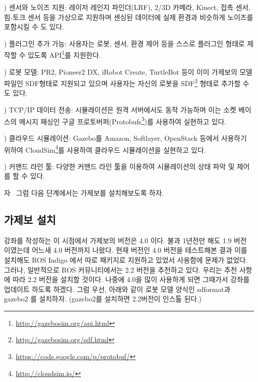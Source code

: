 \vspace{\baselineskip}
\noindent{}
\thenum) 센서와 노이즈 지원: 레이저 레인지 파인더(LRF), 2/3D 카메라, Kinect, 접촉 센서, 힘-토크 센서 등을 가상으로 지원하며 센싱된 데이터에 실제 환경과 비슷하게 노이즈를 포함시킬 수 도 있다.

\vspace{\baselineskip}
\noindent{}
\thenum) 플러그인 추가 가능: 사용자는 로봇, 센서, 환경 제어 등을 스스로 플러그인 형태로 제작할 수 있도록 API\footnote{\url{http://gazebosim.org/api.html}}를 지원한다.

\vspace{\baselineskip}
\noindent{}
\thenum) 로봇 모델: PR2, Pioneer2 DX, iRobot Create, TurtleBot 등이 이미 가제보의 모델 파일인 SDF형태로 지원되고 있으며 사용자는 자신의 로봇을 SDF\footnote{\url{http://gazebosim.org/sdf.html}} 형태로 추가할 수도 있다.

\vspace{\baselineskip}
\noindent{}
\thenum) TCP/IP 데이터 전송: 시뮬레이션은 원격 서버에서도 동작 가능하며 이는 소켓 베이스의 메시지 패싱인 구글 프로토버퍼(Protobufs\footnote{\url{https://code.google.com/p/protobuf/}})를 사용하여 실현하고 있다.

\vspace{\baselineskip}
\noindent{}
\thenum) 클라우드 시뮬레이션: Gazebo를 Amazon, Softlayer, OpenStack 등에서 사용하기 위하여 CloudSim\footnote{\url{http://cloudsim.io/}}를 사용하여 클라우드 시뮬레이션을 실현하고 있다.

\vspace{\baselineskip}
\noindent{}
\thenum) 커맨드 라인 툴: 다양한 커맨드 라인 툴을 이용하여 시뮬레이션의 상태 파악 및 제어를 할 수 있다.

\noindent
자~ 그럼 다음 단계에서는 가제보를 설치해보도록 하자.

\subsection{가제보 설치}

강좌를 작성하는 이 시점에서 가제보의 버전은 4.0 이다. 불과 1년전만 해도 1.9 버전 이였는데 어느새 4.0 버전까지 나왔다. 현재 버전인 4.0 버전을 테스트해본 결과 이를 설치해도 ROS Indigo 에서 따로 패키지로 지원하고 있었서 사용함에 문제가 없었다. 그러나, 일반적으로 ROS 커뮤니티에서는 2.2 버전을 추천하고 있다. 우리는 추천 사항에 따라 2.2 버전을 설치할 것이다. 나중에 4.0을 많이 사용하게 되면 그때가서 강좌를 업데이트 하도록 하겠다. 그럼 우선, 아래와 같이 로봇 모델 양식인 sdformat과 gazebo2 를 설치하자. (gazebo2를 설치하면 2.2버전이 인스톨 된다.)

